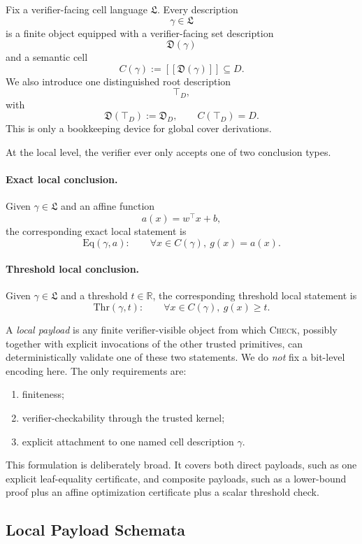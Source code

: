 Fix a verifier-facing cell language $\mathfrak L$. Every description
\[
\gamma\in \mathfrak L
\]
is a finite object equipped with a verifier-facing set description
\[
\mathfrak D(\gamma)
\]
and a semantic cell
\[
C(\gamma):=[\![\mathfrak D(\gamma)]\!]\subseteq D.
\]
We also introduce one distinguished root description
\[
\top_D,
\]
with
\[
\mathfrak D(\top_D):=\mathfrak D_D,
\qquad
C(\top_D)=D.
\]
This is only a bookkeeping device for global cover derivations.

At the local level, the verifier ever only accepts one of two conclusion types.

\paragraph{Exact local conclusion.}
Given $\gamma\in\mathfrak L$ and an affine function
\[
a(x)=w^\top x+b,
\]
the corresponding exact local statement is
\[
\mathrm{Eq}(\gamma,a):
\qquad
\forall x\in C(\gamma),\ g(x)=a(x).
\]

\paragraph{Threshold local conclusion.}
Given $\gamma\in\mathfrak L$ and a threshold $t\in\mathbb R$, the corresponding threshold local statement is
\[
\mathrm{Thr}(\gamma,t):
\qquad
\forall x\in C(\gamma),\ g(x)\ge t.
\]

A \emph{local payload} is any finite verifier-visible object from which \textsc{Check}, possibly together with explicit invocations of the other trusted primitives, can deterministically validate one of these two statements. We do \emph{not} fix a bit-level encoding here. The only requirements are:
\begin{enumerate}
    \item finiteness;
    \item verifier-checkability through the trusted kernel;
    \item explicit attachment to one named cell description $\gamma$.
\end{enumerate}

This formulation is deliberately broad. It covers both direct payloads, such as one explicit leaf-equality certificate, and composite payloads, such as a lower-bound proof plus an affine optimization certificate plus a scalar threshold check.

\subsection{Local Payload Schemata}

